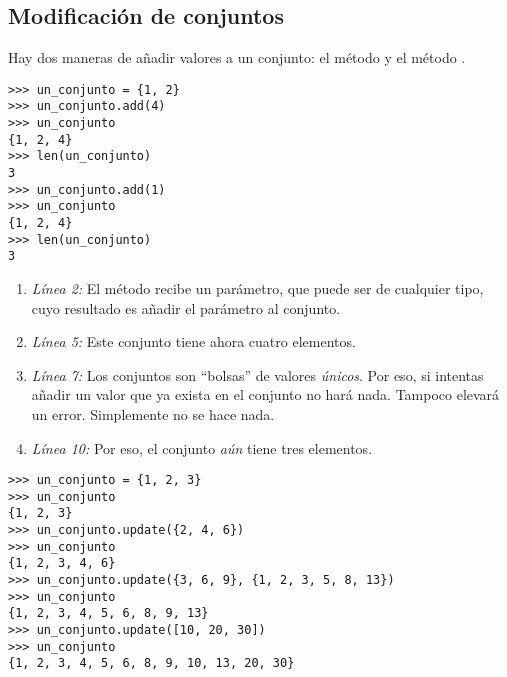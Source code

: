 \subsection{Modificación de conjuntos}

Hay dos maneras de añadir valores a un conjunto: el método  y el método .

\noindent\begin{minipage}{\textwidth}
\begin{lstlisting}[mathescape=True]
>>> un_conjunto = {1, 2}
>>> un_conjunto.add(4)
>>> un_conjunto
{1, 2, 4}
>>> len(un_conjunto)
3
>>> un_conjunto.add(1)
>>> un_conjunto
{1, 2, 4}
>>> len(un_conjunto)
3
\end{lstlisting}
\end{minipage}

\begin{enumerate}

\item \emph{Línea 2:} El método  recibe un parámetro, que puede ser de cualquier tipo, cuyo resultado es añadir el parámetro al conjunto.

\item \emph{Línea 5:} Este conjunto tiene ahora cuatro elementos.

\item \emph{Línea 7:} Los conjuntos son ``bolsas'' de valores \emph{únicos}. Por eso, si intentas añadir un valor que ya exista en el conjunto no hará nada. Tampoco elevará un error. Simplemente no se hace nada.

\item \emph{Línea 10:} Por eso, el conjunto \emph{aún} tiene tres elementos.

\end{enumerate}

\noindent\begin{minipage}{\textwidth}
\begin{lstlisting}[mathescape=True]
>>> un_conjunto = {1, 2, 3}
>>> un_conjunto
{1, 2, 3}
>>> un_conjunto.update({2, 4, 6})
>>> un_conjunto
{1, 2, 3, 4, 6}
>>> un_conjunto.update({3, 6, 9}, {1, 2, 3, 5, 8, 13})
>>> un_conjunto
{1, 2, 3, 4, 5, 6, 8, 9, 13}
>>> un_conjunto.update([10, 20, 30])
>>> un_conjunto
{1, 2, 3, 4, 5, 6, 8, 9, 10, 13, 20, 30}
\end{lstlisting}
\end{minipage}

